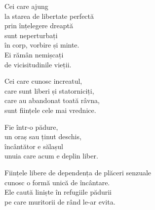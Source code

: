Cei care ajung\\
la starea de libertate perfectă\\
prin înțelegere dreaptă\\
sunt neperturbați\\
în corp, vorbire și minte.\\
Ei rămân nemișcați\\
de vicisitudinile vieții.


Cei care cunosc increatul,\\
care sunt liberi și statorniciți,\\
care au abandonat toată râvna,\\
sunt ființele cele mai vrednice.


Fie într-o pădure,\\
un oraș sau ținut deschis,\\
încântător e sălașul\\
unuia care acum e deplin liber.


Ființele libere de dependența de plăceri senzuale\\
cunosc o formă unică de încântare.\\
Ele caută liniște în refugiile pădurii\\
pe care muritorii de rând le-ar evita.
